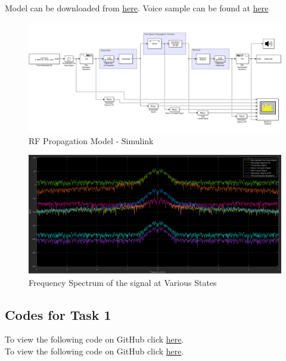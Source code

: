 \documentclass[a4paper,11pt]{article}%
\begin{document}
Model can be downloaded from \href{https://github.com/bimalka98/RF-Propagation-Model/blob/master/RFPL%20Modelling/code/VoiceTransmissionBaseband.slx}{here}. Voice sample can be found at \href{https://github.com/bimalka98/RF-Propagation-Model/blob/master/RFPL%20Modelling/code/voice.wav}{here}
	
\begin{figure}[!h]
	\centering
	\includegraphics[scale = 0.43 ]{figures/model} %
	\caption{RF Propagation Model - Simulink}
\end{figure}
\vspace{1.5cm}

\begin{figure}[!h]
	\centering
	\includegraphics[scale = 0.42]{figures/spect2}
	\caption{Frequency Spectrum of the signal at Various States}
\end{figure}



\pagebreak

\subsection{Codes for Task 1}

To view the following code on GitHub click \href{https://github.com/bimalka98/RF-Propagation-Model/blob/master/RFPL%20Modelling/code/RFPL.m}{here}.\\

\pagebreak
To view the following code on GitHub click \href{https://github.com/bimalka98/RF-Propagation-Model/blob/master/RFPL%20Modelling/code/plotCurve.m}{here}.\\

\vfill
\end{document}
